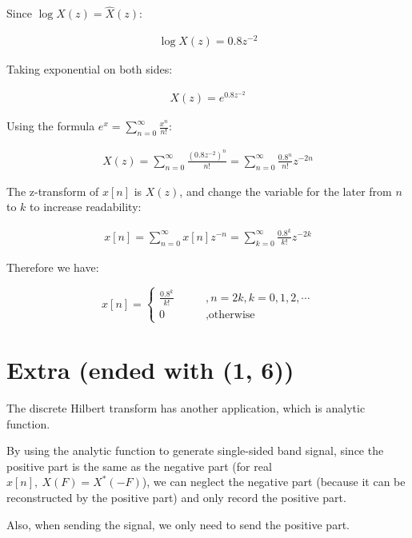 \documentclass{article}
\begin{document}
Since $\log X(z) = \hat{X}(z)$:

\begin{align*}
    \log X(z) = 0.8 z^{-2}
\end{align*}

Taking exponential on both sides:

\begin{align*}
    X(z) = e^{0.8 z^{-2}}
\end{align*}

Using the formula $e^x = \sum_{n=0}^{\infty} \frac{x^n}{n!}$:

\begin{align*}
    X(z) = \sum_{n=0}^{\infty} \frac{(0.8 z^{-2})^n}{n!} = \sum_{n=0}^{\infty} \frac{0.8^n}{n!} z^{-2n}
\end{align*}

The z-transform of $x[n]$ is $X(z)$, and change the variable for the later from $n$ to $k$ to increase readability:

\begin{align*}
    x[n] = \sum_{n=0}^{\infty}x[n] z^{-n} = \sum_{k=0}^{\infty} \frac{0.8^k}{k!} z^{-2k}
\end{align*}

Therefore we have:

\begin{equation*}
x[n] = 
    \begin{cases}
    \frac{0.8^k}{k!} \qquad &,n = 2k, k = 0, 1, 2, \cdots \\
    0 &, \text{otherwise}
    \end{cases}
\end{equation*}




\section*{Extra (ended with (1, 6))}

The discrete Hilbert transform has another application, which is analytic function.
\bigskip

By using the analytic function to generate single-sided band signal, since the positive part is the same as the negative part
(for real $x[n], \ X(F) = X^*(-F)$),
we can neglect the negative part (because it can be reconstructed by the positive part) and only record the positive part.
\bigskip

Also, when sending the signal, we only need to send the positive part.
\end{document}
